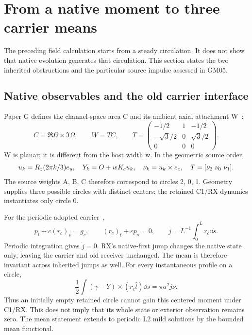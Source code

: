 \section{From a native moment to three carrier means}\label{sec:source}
The preceding field calculation starts from a steady circulation. It does not show that native evolution generates that circulation. This section states the two inherited obstructions and the particular source impulse assessed in GM05.

\subsection{Native observables and the old carrier interface}
Paper G defines the channel-space area C and its ambient axial attachment W~\cite{G}:
\begin{equation}\label{eq:TC}
C=\Re\Omega\times\Im\Omega,\qquad W=TC,\qquad
T=\begin{pmatrix}-1/2&1&-1/2\\-\sqrt3/2&0&\sqrt3/2\\0&0&0\end{pmatrix}.
\end{equation}
W is planar; it is different from the host width w. In the geometric source order,
\begin{equation}\label{eq:threegeometry}
u_k=R_z(2\pi k/3)e_y,\quad
Y_k=O+wK_cu_k,\quad
\nu_k=u_k\times e_z,\quad T=[\nu_2\ \nu_0\ \nu_1].
\end{equation}
The source weights A, B, C therefore correspond to circles 2, 0, 1. Geometry supplies three possible circles with distinct centers; the retained C1/RX dynamics instantiates only circle 0.

For the periodic adopted carrier~\cite{INT,RX},
\begin{equation}\label{eq:C1}
p_t+c(r_c)_s=g_c,\qquad (r_c)_t+cp_s=0,\qquad
j=L^{-1}\int_0^Lr_c\dd s.
\end{equation}
Periodic integration gives \(\dot j=0\). RX's native-first jump changes the native state only, leaving the carrier and old receiver unchanged. The mean is therefore invariant across inherited jumps as well. For every instantaneous profile on a circle,
\begin{equation}\label{eq:meanmoment}
\frac12\int(\gamma-Y)\times(r_c\widehat t)\dd s=\pi a^2j\nu.
\end{equation}
Thus an initially empty retained circle cannot gain this centered moment under C1/RX. This does not imply that its whole state or exterior observation remains zero. The mean statement extends to periodic L2 mild solutions by the bounded mean functional.

